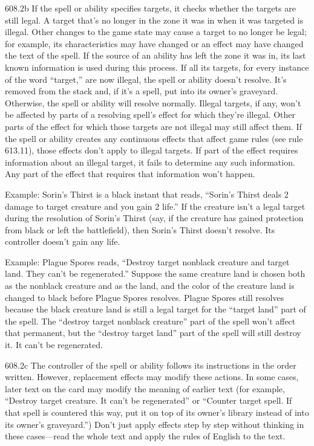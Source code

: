 608.2b If the spell or ability specifies targets, it checks whether the targets are still legal. A target that’s no longer in the zone it was in when it was targeted is illegal. Other changes to the game state may cause a target to no longer be legal; for example, its characteristics may have changed or an effect may have changed the text of the spell. If the source of an ability has left the zone it was in, its last known information is used during this process. If all its targets, for every instance of the word “target,” are now illegal, the spell or ability doesn’t resolve. It’s removed from the stack and, if it’s a spell, put into its owner’s graveyard. Otherwise, the spell or ability will resolve normally. Illegal targets, if any, won’t be affected by parts of a resolving spell’s effect for which they’re illegal. Other parts of the effect for which those targets are not illegal may still affect them. If the spell or ability creates any continuous effects that affect game rules (see rule 613.11), those effects don’t apply to illegal targets. If part of the effect requires information about an illegal target, it fails to determine any such information. Any part of the effect that requires that information won’t happen.

Example: Sorin’s Thirst is a black instant that reads, “Sorin’s Thirst deals 2 damage to target creature and you gain 2 life.” If the creature isn’t a legal target during the resolution of Sorin’s Thirst (say, if the creature has gained protection from black or left the battlefield), then Sorin’s Thirst doesn’t resolve. Its controller doesn’t gain any life.

Example: Plague Spores reads, “Destroy target nonblack creature and target land. They can’t be regenerated.” Suppose the same creature land is chosen both as the nonblack creature and as the land, and the color of the creature land is changed to black before Plague Spores resolves. Plague Spores still resolves because the black creature land is still a legal target for the “target land” part of the spell. The “destroy target nonblack creature” part of the spell won’t affect that permanent, but the “destroy target land” part of the spell will still destroy it. It can’t be regenerated.

608.2c The controller of the spell or ability follows its instructions in the order written. However, replacement effects may modify these actions. In some cases, later text on the card may modify the meaning of earlier text (for example, “Destroy target creature. It can’t be regenerated” or “Counter target spell. If that spell is countered this way, put it on top of its owner’s library instead of into its owner’s graveyard.”) Don’t just apply effects step by step without thinking in these cases—read the whole text and apply the rules of English to the text.

